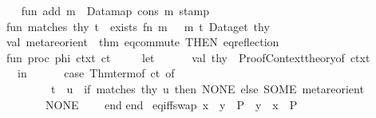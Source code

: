 \begin{isabellebody}
\ \ {\isacharparenright}{\kern0pt}{\isacharsemicolon}{\kern0pt}\isanewline
\ \ fun\ add\ m\ {\isacharequal}{\kern0pt}\ Data{\isachardot}{\kern0pt}map\ {\isacharparenleft}{\kern0pt}cons\ {\isacharparenleft}{\kern0pt}m{\isacharcomma}{\kern0pt}\ stamp\ {\isacharparenleft}{\kern0pt}{\isacharparenright}{\kern0pt}{\isacharparenright}{\kern0pt}{\isacharparenright}{\kern0pt}{\isacharsemicolon}{\kern0pt}\isanewline
\ \ fun\ matches\ thy\ t\ {\isacharequal}{\kern0pt}\ exists\ {\isacharparenleft}{\kern0pt}fn\ {\isacharparenleft}{\kern0pt}m{\isacharcomma}{\kern0pt}\ {\isacharunderscore}{\kern0pt}{\isacharparenright}{\kern0pt}\ {\isacharequal}{\kern0pt}{\isachargreater}{\kern0pt}\ m\ t{\isacharparenright}{\kern0pt}\ {\isacharparenleft}{\kern0pt}Data{\isachardot}{\kern0pt}get\ thy{\isacharparenright}{\kern0pt}{\isacharsemicolon}{\kern0pt}\isanewline
\isanewline
\ \ val\ meta{\isacharunderscore}{\kern0pt}reorient\ {\isacharequal}{\kern0pt}\ {\isacharat}{\kern0pt}{\isacharbraceleft}{\kern0pt}thm\ eq{\isacharunderscore}{\kern0pt}commute\ {\isacharbrackleft}{\kern0pt}THEN\ eq{\isacharunderscore}{\kern0pt}reflection{\isacharbrackright}{\kern0pt}{\isacharbraceright}{\kern0pt}{\isacharsemicolon}{\kern0pt}\isanewline
\ \ fun\ proc\ phi\ ctxt\ ct\ {\isacharequal}{\kern0pt}\isanewline
\ \ \ \ let\isanewline
\ \ \ \ \ \ val\ thy\ {\isacharequal}{\kern0pt}\ Proof{\isacharunderscore}{\kern0pt}Context{\isachardot}{\kern0pt}theory{\isacharunderscore}{\kern0pt}of\ ctxt{\isacharsemicolon}{\kern0pt}\isanewline
\ \ \ \ in\isanewline
\ \ \ \ \ \ case\ Thm{\isachardot}{\kern0pt}term{\isacharunderscore}{\kern0pt}of\ ct\ of\isanewline
\ \ \ \ \ \ \ \ {\isacharparenleft}{\kern0pt}{\isacharunderscore}{\kern0pt}\ {\isachardollar}{\kern0pt}\ t\ {\isachardollar}{\kern0pt}\ u{\isacharparenright}{\kern0pt}\ {\isacharequal}{\kern0pt}{\isachargreater}{\kern0pt}\ if\ matches\ thy\ u\ then\ NONE\ else\ SOME\ meta{\isacharunderscore}{\kern0pt}reorient\isanewline
\ \ \ \ \ \ {\isacharbar}{\kern0pt}\ {\isacharunderscore}{\kern0pt}\ {\isacharequal}{\kern0pt}{\isachargreater}{\kern0pt}\ NONE\isanewline
\ \ \ \ end{\isacharsemicolon}{\kern0pt}\isanewline
end{\isacharsemicolon}{\kern0pt}\isanewline
{\isacartoucheclose}%
\endisatagML
{\isafoldML}%
%
\isadelimML
%
\endisadelimML
%
\isadelimdocument
%
\endisadelimdocument
%
\isatagdocument
%
\isamarkuptrue%
%
\endisatagdocument
{\isafolddocument}%
%
\isadelimdocument
%
\endisadelimdocument
{}\isamarkupfalse%
\ eq{\isacharunderscore}{\kern0pt}iff{\isacharunderscore}{\kern0pt}swap{\isacharcolon}{\kern0pt}\ {\isachardoublequoteopen}{\isacharparenleft}{\kern0pt}x\ {\isacharequal}{\kern0pt}\ y\ {\isasymlongleftrightarrow}\ P{\isacharparenright}{\kern0pt}\ {\isasymLongrightarrow}\ {\isacharparenleft}{\kern0pt}y\ {\isacharequal}{\kern0pt}\ x\ {\isasymlongleftrightarrow}\ P{\isacharparenright}{\kern0pt}{\isachardoublequoteclose}\isanewline

\end{isabellebody}
